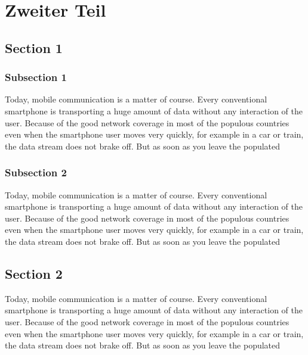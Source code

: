 
\chapter{Zweiter Teil}

\section{Section 1}

\subsection{Subsection 1}

Today, mobile communication is a matter of course. Every conventional 
smartphone is transporting a huge amount of data without any interaction of the
user. Because of the good network coverage in most of the populous countries
even when the smartphone user moves very quickly, for example in a car or train,
the data stream does not brake off. But as soon as you leave the populated

\subsection{Subsection 2}

Today, mobile communication is a matter of course. Every conventional
smartphone is transporting a huge amount of data without any interaction of the
user. Because of the good network coverage in most of the populous countries
even when the smartphone user moves very quickly, for example in a car or train,
the data stream does not brake off. But as soon as you leave the populated

\section{Section 2}

Today, mobile communication is a matter of course. Every conventional
smartphone is transporting a huge amount of data without any interaction of the
user. Because of the good network coverage in most of the populous countries
even when the smartphone user moves very quickly, for example in a car or train,
the data stream does not brake off. But as soon as you leave the populated

\clearpage
